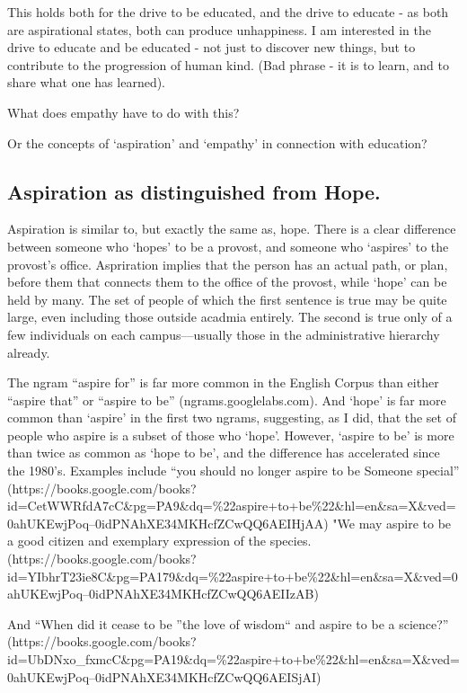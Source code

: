 This holds both for the drive to be educated, and the drive to educate - as both are aspirational states, both can produce unhappiness.
I am interested in the drive to educate and be educated - not just to discover new things, but to contribute to the progression of human kind. (Bad phrase - it is to learn, and to share what one has learned).

What does empathy have to do with this?

Or the concepts of `aspiration' and `empathy' in connection with education?

\subsection{Aspiration as distinguished from Hope.}
\label{aspirationasdistinguishedfromhope.}

Aspiration is similar to, but exactly the same as, hope. There is a clear difference between someone who `hopes' to be a provost, and someone who `aspires' to the provost's office. Aspriration implies that the person has an actual path, or plan, before them that connects them to the office of the provost, while `hope' can be held by many. The set of people of which the first sentence is true may be quite large, even including those outside acadmia entirely. The second is true only of a few individuals on each campus---usually those in the administrative hierarchy already.

The ngram ``aspire for'' is far more common in the English Corpus than either ``aspire that'' or ``aspire to be'' (ngrams.googlelabs.com). And `hope' is far more common than `aspire' in the first two ngrams, suggesting, as I did, that the set of people who aspire is a subset of those who `hope'. However, `aspire to be' is more than twice as common as `hope to be', and the difference has accelerated since the 1980's.
Examples include ``you should no longer aspire to be Someone special'' (https:\slash \slash books.google.com\slash books?id=CetWWRfdA7cC\&pg=PA9\&dq=\%22aspire+to+be\%22\&hl=en\&sa=X\&ved=0ahUKEwjPoq--0idPNAhXE34MKHcfZCwQQ6AEIHjAA)
"We may aspire to be a good citizen and exemplary expression of the species. (https:\slash \slash books.google.com\slash books?id=YIbhrT23ie8C\&pg=PA179\&dq=\%22aspire+to+be\%22\&hl=en\&sa=X\&ved=0ahUKEwjPoq--0idPNAhXE34MKHcfZCwQQ6AEIIzAB) 

And ``When did it cease to be ''the love of wisdom`` and aspire to be a science?'' (https:\slash \slash books.google.com\slash books?id=UbDNxo\_fxmcC\&pg=PA19\&dq=\%22aspire+to+be\%22\&hl=en\&sa=X\&ved=0ahUKEwjPoq--0idPNAhXE34MKHcfZCwQQ6AEISjAI)

